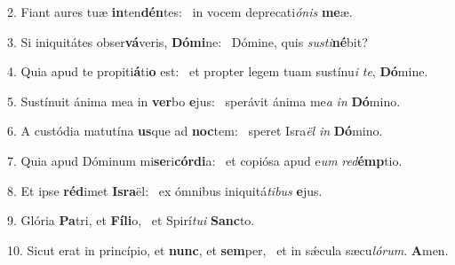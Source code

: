 2. Fiant aures tuæ \textbf{in}ten\textbf{dén}tes: \ast\  in vocem deprecati\textit{ó}\textit{nis} \textbf{me}æ.\

3. Si iniquitátes obser\textbf{vá}veris, \textbf{Dó}\textbf{mi}ne: \ast\  Dómine, quis \textit{sus}\textit{ti}\textbf{né}bit?\

4. Quia apud te propiti\textbf{á}ti\textbf{o} est: \ast\  et propter legem tuam sustínu\textit{i} \textit{te}, \textbf{Dó}mine.\

5. Sustínuit ánima mea in \textbf{ver}bo \textbf{e}jus: \ast\  sperávit ánima me\textit{a} \textit{in} \textbf{Dó}mino.\

6. A custódia matutína \textbf{us}que ad \textbf{noc}tem: \ast\  speret Isra\textit{ël} \textit{in} \textbf{Dó}mino.\

7. Quia apud Dóminum mi\textbf{se}ri\textbf{cór}\textbf{di}a: \ast\  et copiósa apud e\textit{um} \textit{red}\textbf{émp}tio.\

8. Et ipse \textbf{réd}imet \textbf{Is}\textbf{ra}ël: \ast\  ex ómnibus iniquitá\textit{ti}\textit{bus} \textbf{e}jus.\

9. Glória \textbf{Pa}tri, et \textbf{Fí}\textbf{li}o, \ast\  et Spirí\textit{tu}\textit{i} \textbf{Sanc}to.\

10. Sicut erat in princípio, et \textbf{nunc}, et \textbf{sem}per, \ast\  et in sǽcula sæcu\textit{ló}\textit{rum}. \textbf{A}men.\

